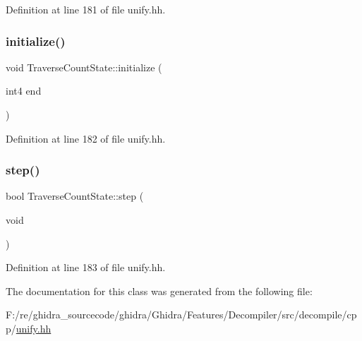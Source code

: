 Definition at line 181 of file unify.\+hh.

\mbox{\label{class_traverse_count_state_a5ddb09f879e051ef21602a3c283d6216}} 
\subsubsection{\texorpdfstring{initialize()}{initialize()}}
{\footnotesize\ttfamily void Traverse\+Count\+State\+::initialize (\begin{DoxyParamCaption}\item[{int4}]{end }\end{DoxyParamCaption})\hspace{0.3cm}{\ttfamily [inline]}}



Definition at line 182 of file unify.\+hh.

\mbox{\label{class_traverse_count_state_aa628724934c8b276caddeb1158eb9ce0}} 
\subsubsection{\texorpdfstring{step()}{step()}}
{\footnotesize\ttfamily bool Traverse\+Count\+State\+::step (\begin{DoxyParamCaption}\item[{void}]{ }\end{DoxyParamCaption})\hspace{0.3cm}{\ttfamily [inline]}}



Definition at line 183 of file unify.\+hh.



The documentation for this class was generated from the following file\+:\begin{DoxyCompactItemize}
\item 
F\+:/re/ghidra\+\_\+sourcecode/ghidra/\+Ghidra/\+Features/\+Decompiler/src/decompile/cpp/\mbox{\hyperlink{unify_8hh}{unify.\+hh}}\end{DoxyCompactItemize}
